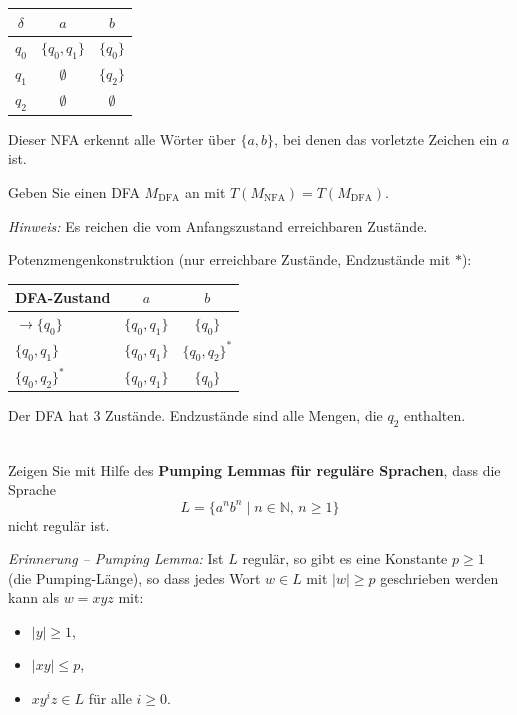 \begin{center}
\begin{tabular}{c|cc}
  $\delta$ & $a$ & $b$ \\
  \hline
  $q_0$ & $\{q_0, q_1\}$ & $\{q_0\}$ \\
  $q_1$ & $\emptyset$ & $\{q_2\}$ \\
  $q_2$ & $\emptyset$ & $\emptyset$ \\
\end{tabular}
\end{center}

Dieser NFA erkennt alle Wörter über $\{a,b\}$, bei denen das vorletzte Zeichen ein $a$ ist.

Geben Sie einen DFA $M_\text{DFA}$ an mit $T(M_\text{NFA}) = T(M_\text{DFA})$.

\textit{Hinweis:} Es reichen die vom Anfangszustand erreichbaren Zustände.

\begin{loesung}
Potenzmengenkonstruktion (nur erreichbare Zustände, Endzustände mit $*$):

\begin{center}
\begin{tabular}{l|cc}
  DFA-Zustand & $a$ & $b$ \\
  \hline
  $\to\{q_0\}$ & $\{q_0,q_1\}$ & $\{q_0\}$ \\
  $\{q_0,q_1\}$ & $\{q_0,q_1\}$ & $\{q_0,q_2\}^*$ \\
  $\{q_0,q_2\}^*$ & $\{q_0,q_1\}$ & $\{q_0\}$ \\
\end{tabular}
\end{center}

Der DFA hat 3 Zustände. Endzustände sind alle Mengen, die $q_2$ enthalten.
\end{loesung}

\\
Zeigen Sie mit Hilfe des \textbf{Pumping Lemmas für reguläre Sprachen}, dass die Sprache
\[
  L = \{ a^n b^n \mid n \in \mathbb{N},\, n \geq 1 \}
\]
nicht regulär ist.

\textit{Erinnerung -- Pumping Lemma:} Ist $L$ regulär, so gibt es eine Konstante $p \geq 1$ (die Pumping-Länge), so dass jedes Wort $w \in L$ mit $|w| \geq p$ geschrieben werden kann als $w = xyz$ mit:
\begin{itemize}
  \item $|y| \geq 1$,
  \item $|xy| \leq p$,
  \item $xy^i z \in L$ für alle $i \geq 0$.
\end{itemize}

